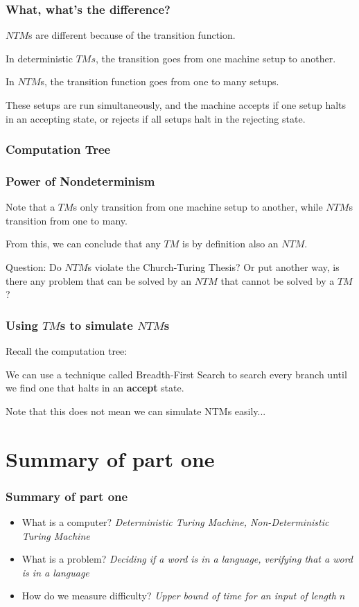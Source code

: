 \documentclass[aspectratio=169]{beamer}
\begin{document}
\begin{frame}
\frametitle{What, what's the difference?}
$NTM$s are different because of the transition function.

In deterministic $TMs$, the transition goes from one machine setup to another.

In $NTM$s, the transition function goes from one to many setups.

These setups are run simultaneously, and the machine accepts if one setup halts in an accepting state, or rejects if all setups halt in the rejecting state.
\end{frame}

\begin{frame}
\frametitle{Computation Tree}

\end{frame}

\begin{frame}
\frametitle{Power of Nondeterminism}
Note that a $TM$s only transition from one machine setup to another, while $NTM$s transition from one to many.

From this, we can conclude that any $TM$ is by definition also an $NTM$.

Question: Do $NTM$s violate the Church-Turing Thesis? Or put another way, is there any problem that can be solved by an $NTM$ that cannot be solved by a $TM$?
\end{frame}

\begin{frame}
\frametitle{Using $TM$s to simulate $NTM$s}
Recall the computation tree:

We can use a technique called Breadth-First Search to search every branch until we find one that halts in an {\bf accept} state.

Note that this does not mean we can simulate NTMs easily...
\end{frame}

\section{Summary of part one}

\begin{frame}
\frametitle{Summary of part one}
\begin{itemize}
    \item What is a computer? {\em Deterministic Turing Machine, Non-Deterministic Turing Machine}
    \item What is a problem? {\em Deciding if a word is in a language, verifying that a word is in a language}
    \item How do we measure difficulty? {\em Upper bound of time for an input of length $n$}
\end{itemize}
\end{frame}
\end{document}
